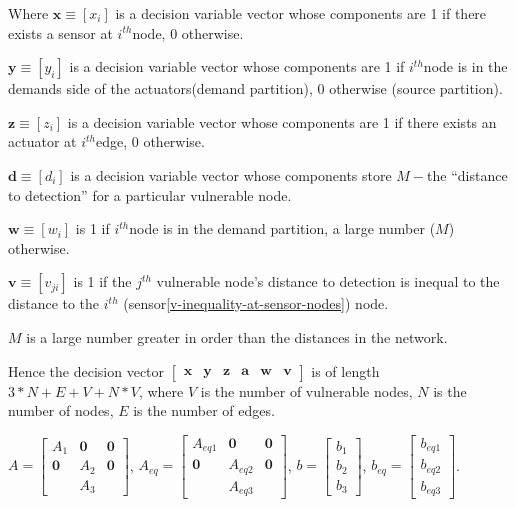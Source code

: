 \documentclass[authoryear,preprint,review,12pt]{elsarticle}
\begin{document}
Where $\mathbf{x}\equiv[x_{i}]$ is a decision variable vector whose
components are 1 if there exists a sensor at $i^{th}$node, 0 otherwise.

$\mathbf{y}\equiv[y_{i}]$ is a decision variable vector whose components
are 1 if $i^{th}$node is in the demands side of the actuators(demand
partition), 0 otherwise (source partition).

$\mathbf{z}\equiv[z_{i}]$ is a decision variable vector whose components
are 1 if there exists an actuator at $i^{th}$edge, 0 otherwise.

$\mathbf{d}\equiv[d_{i}]$ is a decision variable vector whose components
store $M-$the ``distance to detection'' for a particular vulnerable
node.

$\mathbf{w}\equiv[w_{i}]$ is 1 if $i^{th}$node is in the demand
partition, a large number ($M$) otherwise.

$\mathbf{v}\equiv[v_{ji}]$ is 1 if the $j^{th}$ vulnerable node's
distance to detection is inequal to the distance to the $i^{th}$
(sensor\ref{v-inequality-at-sensor-nodes}) node.

$M$ is a large number greater in order than the distances in the
network.

Hence the decision vector $\left[\mathbf{\begin{array}{cccccc}
\mathbf{x} & y & z & a & w & \mathbf{v}\end{array}}\right]$ is of length $3*N+E+V+N*V$, where $V$ is the number of vulnerable
nodes, $N$ is the number of nodes, $E$ is the number of edges.

$A=\left[\begin{array}{ccc}
A_{1} & \mathbf{0} & \mathbf{0}\\
\mathbf{0} & A_{2} & \mathbf{0}\\
\mathbf{} & A_{3}
\end{array}\right]$, $A_{eq}=\left[\begin{array}{ccc}
A_{eq1} & \mathbf{0} & \mathbf{0}\\
\mathbf{0} & A_{eq2} & \mathbf{0}\\
 & A_{eq3}
\end{array}\right]$, $b=\left[\begin{array}{c}
b_{1}\\
b_{2}\\
b_{3}
\end{array}\right]$, $b_{eq}=\left[\begin{array}{c}
b_{eq1}\\
b_{eq2}\\
b_{eq3}
\end{array}\right]$.
\end{document}
